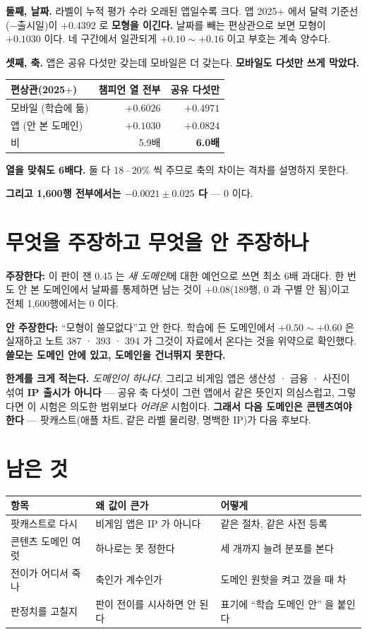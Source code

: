 \documentclass[11pt]{article}
\begin{document}
\textbf{둘째, 날짜.} 라벨이 누적 평가 수라 오래된 앱일수록 크다. 앱
2025$+$ 에서 달력 기준선($-$출시일)이 $\mathbf{+0.4392}$ 로 \textbf{모형을
이긴다.} 날짜를 빼는 편상관으로 보면 모형이 $+0.1030$ 이다. 네 구간에서
일관되게 $+0.10 \sim +0.16$ 이고 부호는 계속 양수다.

\textbf{셋째, 축.} 앱은 공유 다섯만 갖는데 모바일은 더 갖는다. \textbf{모바일도
다섯만 쓰게 막았다.}

\begin{center}
\begin{tabular}{lrr}
\hline
편상관(2025$+$) & 챔피언 열 전부 & 공유 다섯만 \\
\hline
모바일 (학습에 듦) & $+0.6026$ & $+0.4971$ \\
앱 (안 본 도메인) & $+0.1030$ & $+0.0824$ \\
\hline
비 & 5.9배 & \textbf{6.0배} \\
\hline
\end{tabular}
\end{center}

\textbf{열을 맞춰도 6배다.} 둘 다 18\,--\,20\% 씩 주므로 축의 차이는 격차를
설명하지 못한다.

\textbf{그리고 1,600행 전부에서는 $-0.0021 \pm 0.025$ 다} --- 0 이다.

\section{무엇을 주장하고 무엇을 안 주장하나}

\textbf{주장한다:} 이 판이 잰 0.45 는 \emph{새 도메인}에 대한 예언으로
쓰면 최소 6배 과대다. 한 번도 안 본 도메인에서 날짜를 통제하면 남는 것이
$+0.08$(189행, 0 과 구별 안 됨)이고 전체 1,600행에서는 0 이다.

\textbf{안 주장한다:} ``모형이 쓸모없다''고 안 한다. 학습에 든 도메인에서
$+0.50 \sim +0.60$ 은 실재하고 노트 387 · 393 · 394 가 그것이 자료에서
온다는 것을 위약으로 확인했다. \textbf{쓸모는 도메인 안에 있고, 도메인을
건너뛰지 못한다.}

\textbf{한계를 크게 적는다.} \emph{도메인이 하나다.} 그리고 비게임 앱은
생산성 · 금융 · 사진이 섞여 \textbf{IP 출시가 아니다} --- 공유 축 다섯이
그런 앱에서 같은 뜻인지 의심스럽고, 그렇다면 이 시험은 의도한 범위보다
\emph{어려운} 시험이다. \textbf{그래서 다음 도메인은 콘텐츠여야 한다} ---
팟캐스트(애플 차트, 같은 라벨 물리량, 명백한 IP)가 다음 후보다.

\section{남은 것}

\begin{center}
\begin{tabular}{lll}
\hline
항목 & 왜 값이 큰가 & 어떻게 \\
\hline
팟캐스트로 다시 & 비게임 앱은 IP 가 아니다 & 같은 절차, 같은 사전 등록 \\
콘텐츠 도메인 여럿 & 하나로는 못 정한다 & 세 개까지 늘려 분포를 본다 \\
전이가 어디서 죽나 & 축인가 계수인가 & 도메인 원핫을 켜고 껐을 때 차 \\
판정치를 고칠지 & 판이 전이를 시사하면 안 된다 & 표기에 ``학습 도메인 안'' 을 붙인다 \\
\hline
\end{tabular}
\end{center}
\end{document}
